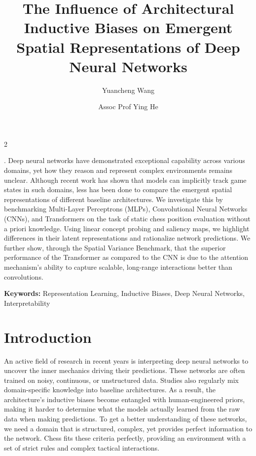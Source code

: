 \documentclass[a4paper,10pt]{article}
\title{\textbf{The Influence of Architectural Inductive Biases on Emergent Spatial Representations of Deep Neural Networks}\\[1em]}
\date{}
\author{
    \parbox[t]{0.45\textwidth}{
        \centering
        Yuancheng Wang \\
        \makebox[\linewidth]{{\fontsize{11.6pt}{0pt}\selectfont School of Electrical and Electronic Engineering}}
    }
    \and
    \parbox[t]{0.45\textwidth}{
        \centering
        Assoc Prof Ying He \\
        \makebox[\linewidth]{{\fontsize{11.6pt}{0pt}\selectfont College of Computing and Data Science}}
    }
}\\
\renewenvironment{abstract}{
    \small
    \noindent\textbf{\textit{\abstractname}}.\hspace{1em}} %
    {}
\begin{document}

\maketitle
\thispagestyle{fancy} %

\begin{multicols*}{2}

\begin{abstract}
Deep neural networks have demonstrated exceptional capability across various domains, yet how they reason and represent complex environments remains unclear. Although recent work has shown that models can implicitly track game states in such domains, less has been done to compare the emergent spatial representations of different baseline architectures. We investigate this by benchmarking Multi-Layer Perceptrons (MLPs), Convolutional Neural Networks (CNNs), and Transformers on the task of static chess position evaluation without a priori knowledge. Using linear concept probing and saliency maps, we highlight differences in their latent representations and rationalize network predictions. We further show, through the Spatial Variance Benchmark, that the superior performance of the Transformer as compared to the CNN is due to the attention mechanism's ability to capture scalable, long-range interactions better than convolutions.

\end{abstract}

\textbf{Keywords:} Representation Learning, Inductive Biases, Deep Neural Networks, Interpretability

\section{Introduction}
An active field of research in recent years is interpreting deep neural networks to uncover the inner mechanics driving their predictions. These networks are often trained on noisy, continuous, or unstructured data. Studies also regularly mix domain-specific knowledge into baseline architectures. As a result, the architecture's inductive biases become entangled with human-engineered priors, making it harder to determine what the models actually learned from the raw data when making predictions. To get a better understanding of these networks, we need a domain that is structured, complex, yet provides perfect information to the network. Chess fits these criteria perfectly, providing an environment with a set of strict rules and complex tactical interactions.


\end{multicols*}
\end{document}
